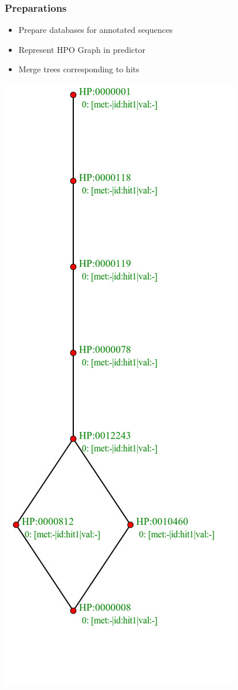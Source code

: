 \documentclass{beamer}
\begin{document}
\begin{frame}
	\frametitle{Preparations}
		\begin{itemize}
			\item Prepare databases for annotated sequences
			\item Represent HPO Graph in predictor
			\item Merge trees corresponding to hits
		\end{itemize}
		\begin{minipage}{0.2\textwidth}
			\includegraphics[width=\textwidth]{p1.jpg}	

\end{minipage}
\end{frame}
\end{document}
